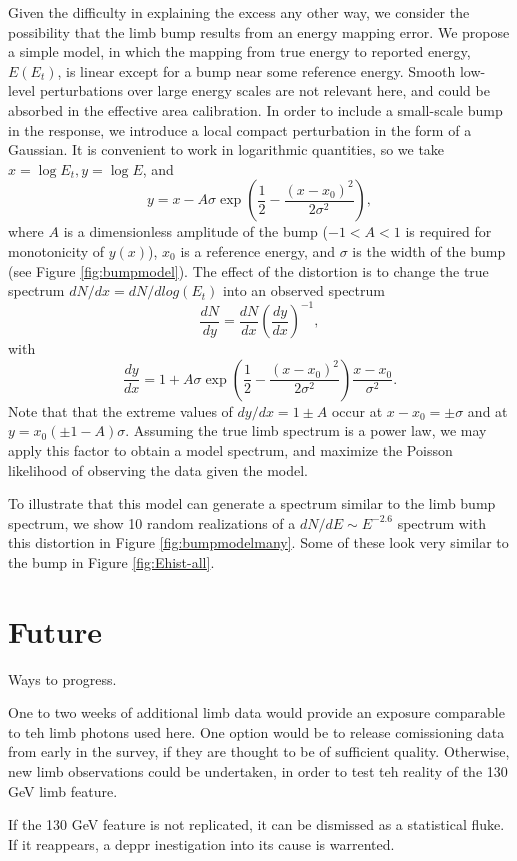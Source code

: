 \documentclass[aps,twocolumn,prd,superscriptaddress,showpacs,nofootinbib,fixfloat]{revtex4}
\newcommand{\be}{\begin{equation}}
\newcommand{\ee}{\end{equation}}
\begin{document}
Given the difficulty in explaining the excess any other way, we consider the
possibility that the limb bump results from an energy mapping error.  We
propose a simple model, in which the mapping from true energy to reported
energy, $E(E_t)$, is linear except for a bump near some reference energy.
Smooth low-level perturbations over large energy scales are not relevant here,
and could be absorbed in the effective area calibration.  In order to include
a small-scale bump in the response, we introduce a local compact perturbation
in the form of a Gaussian.  It is convenient to work in logarithmic
quantities, so we take $x=\log E_t, y=\log E$, and
\be
\label{eq:yofx}
y=x - A\sigma \exp\left(\frac{1}{2}-\frac{(x-x_0)^2}{2\sigma^2}\right),
\ee
where $A$ is a dimensionless amplitude of the bump ($-1<A<1$ is required
for monotonicity of $y(x)$), $x_0$ is a reference energy, and $\sigma$ is the
width of the bump (see Figure \ref{fig:bumpmodel}).
The effect of the distortion is to change the true spectrum $dN/dx =
dN/dlog(E_t)$ into an observed spectrum
\be
\label{eq:dndy}
\frac{dN}{dy} = \frac{dN}{dx} \left(\frac{dy}{dx}\right)^{-1} ,
\ee
with
\be
\label{eq:dydx}
\frac{dy}{dx} = 1 + A\sigma \exp\left(\frac{1}{2}-\frac{(x-x_0)^2}{2\sigma^2}\right)
\frac{x-x_0}{\sigma^2}.
\ee
Note that that the extreme values of $dy/dx = 1 \pm A$ occur at $x-x_0 = \pm
\sigma$ and at $y=x_0(\pm1-A)\sigma$.  Assuming the true limb spectrum is a
power law, we may apply this factor to obtain a model spectrum, and maximize
the Poisson likelihood of observing the data given the model.

To illustrate that this model can generate a spectrum similar to the limb bump
spectrum, we show 10 random realizations of a $dN/dE \sim E^{-2.6}$ spectrum
with this distortion in Figure \ref{fig:bumpmodelmany}.
Some of these look very similar to the bump in Figure \ref{fig:Ehist-all}.


\clearpage
\section{Future}
Ways to progress.

One to two weeks of additional limb data would provide an exposure comparable
to teh limb photons used here.  One option would be to release comissioning
data from early in the survey, if they are thought to be of sufficient
quality.  Otherwise, new limb observations could be undertaken, in order to
test teh reality of the 130 GeV limb feature.  

If the 130 GeV feature is not replicated, it can be dismissed as a statistical
fluke.  If it reappears, a deppr inestigation into its cause is warrented.  
\end{document}
